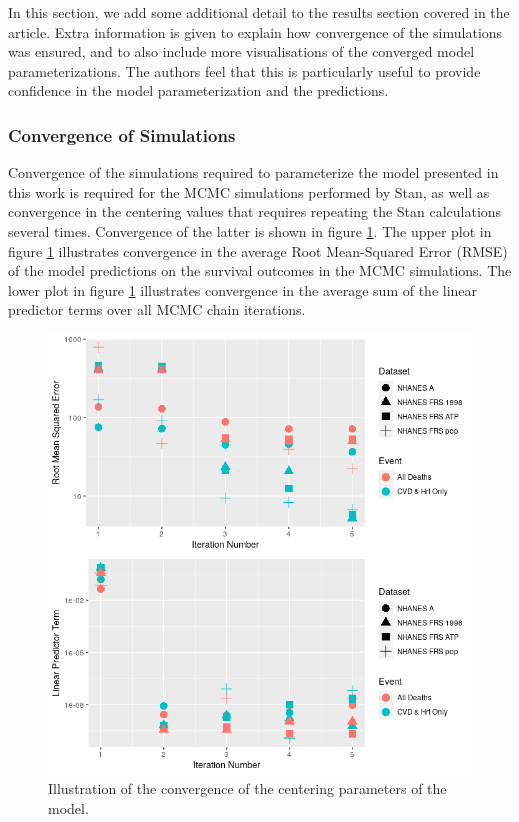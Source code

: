 \documentclass[
]{article}
\begin{document}
In this section, we add some additional detail to the results section
covered in the article. Extra information is given to explain how
convergence of the simulations was ensured, and to also include more
visualisations of the converged model parameterizations. The authors
feel that this is particularly useful to provide confidence in the model
parameterization and the predictions.

\hypertarget{convergence-of-simulations}{%
\subsubsection{Convergence of
Simulations}\label{convergence-of-simulations}}

Convergence of the simulations required to parameterize the model
presented in this work is required for the MCMC simulations performed by
Stan, as well as convergence in the centering values that requires
repeating the Stan calculations several times. Convergence of the latter
is shown in figure \ref{fig:linpred_conv}. The upper plot in figure
\ref{fig:linpred_conv} illustrates convergence in the average Root
Mean-Squared Error (RMSE) of the model predictions on the survival
outcomes in the MCMC simulations. The lower plot in figure
\ref{fig:linpred_conv} illustrates convergence in the average sum of the
linear predictor terms over all MCMC chain iterations.

\begin{figure}
\hypertarget{fig:linpred_conv}{%
\centering
\includegraphics{./Plots/xhat/RMSE-Linpred_Convergence.png}
\caption{Illustration of the convergence of the centering parameters of
the model.}\label{fig:linpred_conv}
}
\end{figure}
\end{document}
